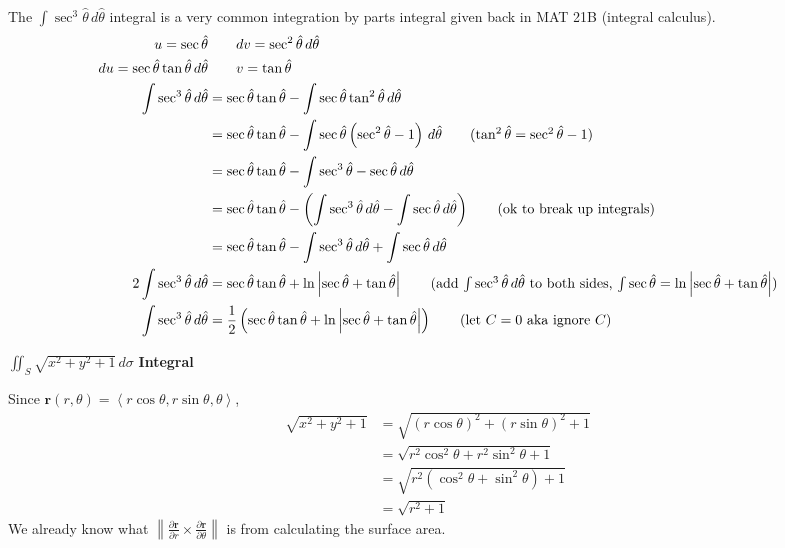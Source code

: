 \documentclass{article}
\newcommand{\lrp}[1]{\left( #1 \right)}
\newcommand{\lra}[1]{\left\langle #1 \right\rangle}
\newcommand{\norm}[1]{\left\lVert #1 \right\rVert}
\renewcommand{\r}[0]{\mathbf{r}}
\begin{document}
The $\displaystyle \int \sec^3 \hat{\theta}\,d\hat{\theta}$ integral is a very common integration by parts integral given back in MAT 21B (integral calculus).
\begin{align*}
    u=\sec \hat{\theta} &\hspace{2em}dv=\sec^2 \hat{\theta}\,d\hat{\theta}\\
    du=\sec\hat{\theta}\tan\hat{\theta}\,d\hat{\theta}&\hspace{2em}v=\tan \hat{\theta}\\
    \int\sec^3 \hat{\theta}\,d\hat{\theta}&=\sec\hat{\theta}\tan\hat{\theta}-\int \sec\hat{\theta}\tan^2\hat{\theta}\,d\hat{\theta}\\
    &=\sec \hat{\theta}\tan\hat{\theta}-\int \sec\hat{\theta}\lrp{\sec^2 \hat{\theta}-1}\,d\hat{\theta}\tag{$\tan^2\hat{\theta}=\sec^2\hat{\theta}-1$}\\
    &=\sec\hat{\theta}\tan\hat{\theta}-\int \sec^3 \hat{\theta} - \sec \hat{\theta}\,d\hat{\theta}\\
    &=\sec\hat{\theta}\tan\hat{\theta}-\lrp{\int \sec^3 \hat{\theta}\,d\hat{\theta} - \int \sec \hat{\theta}\,d\hat{\theta}}\tag{ok to break up integrals}\\
    &=\sec\hat{\theta}\tan\hat{\theta}-\int \sec^3\hat{\theta}\,d\hat{\theta} + \int \sec\hat{\theta}\,d\hat{\theta}\\
    2\int \sec^3\hat{\theta}\,d\hat{\theta}&=\sec\hat{\theta}\tan\hat{\theta}+\ln\left|\sec \hat{\theta}+\tan \hat{\theta}\right|\tag{add $\int\sec^3\hat{\theta}\,d\hat{\theta}$ to both sides, $\int\sec \hat{\theta}=\ln\left|\sec \hat{\theta}+\tan\hat{\theta}\right|$}\\
    \int \sec^3 \hat{\theta}\,d\hat{\theta}&=\frac{1}{2}\lrp{\sec\hat{\theta}\tan\hat{\theta}+\ln\left|\sec \hat{\theta}+\tan\hat{\theta}\right|}\tag{let $C=0$ aka ignore $C$}
\end{align*}
{} $\displaystyle\iint_S \sqrt{x^2+y^2+1}\,d\sigma$ \textbf{Integral}

Since $\r(r,\theta)=\lra{r\cos\theta, r\sin\theta,\theta}$,
\begin{align*}
    \sqrt{x^2+y^2+1}&=\sqrt{\lrp{r\cos\theta}^2+\lrp{r\sin\theta}^2+1}\\
    &=\sqrt{r^2\cos^2\theta+r^2\sin^2\theta+1}\\
    &=\sqrt{r^2\lrp{\cos^2\theta+\sin^2\theta}+1}\\
    &=\sqrt{r^2+1}\tag{$\cos^2\theta+\sin^2\theta=1$}
\end{align*}
We already know what $\displaystyle \norm{\frac{\partial \r}{\partial r}\times \frac{\partial \r}{\partial \theta}}$ is from calculating the surface area.
\end{document}
